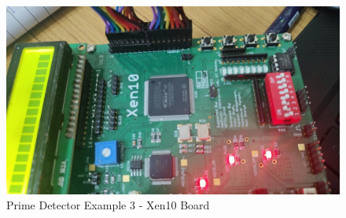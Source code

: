 \documentclass[12pt]{article}
\begin{document}
\begin{figure}[H]
\centering
  \includegraphics[scale=0.35]{Images/Trial03.jpeg}
  \caption{Prime Detector Example 3 - Xen10 Board}
\end{figure}
\end{document}

